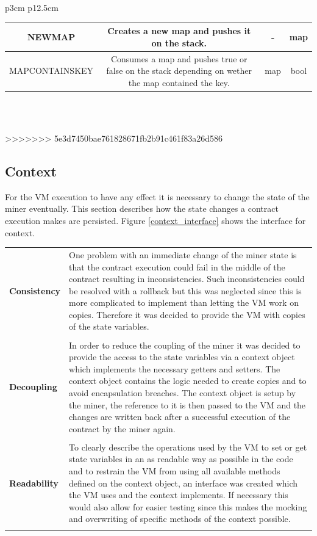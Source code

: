 \begin{tabular}[t]{ p{3cm} p{12.5cm}}
\begin{tabular}[t]{ | c | c | c | c | }
NEWMAP &
Creates a new map and pushes it on the stack. &
- &
map \\ \hline

MAPCONTAINSKEY &
Consumes a map and pushes true or false on the stack depending on wether the map contained the key. &
map &
bool \\ \hline

\end{tabular}
 \\ \\

\end{tabular}

>>>>>>> 5e3d7450bae761828671fb2b91c461f83a26d586
\subsection{Context}
For the VM execution to have any effect it is necessary to change the state of the miner eventually. This section describes how the state changes a contract execution makes are persisted. Figure \ref{context_interface} shows the interface for context.

\begin{tabular}[t]{ p{3cm} p{12.5cm}}
\raggedright
\textbf{Consistency} &
One problem with an immediate change of the miner state is that the contract execution could fail in the middle of the contract resulting in inconsistencies. Such inconsistencies could be resolved with a rollback but this was neglected since this is more complicated to implement than letting the VM work on copies. Therefore it was decided to provide the VM with copies of the state variables. \\ \\

\raggedright
\textbf{Decoupling} &
In order to reduce the coupling of the miner it was decided to provide the access to the state variables via a context object which implements the necessary getters and setters. The context object contains the logic needed to create copies and to avoid encapsulation breaches. The context object is setup by the miner, the reference to it is then passed to the VM and the changes are written back after a successful execution of the contract by the miner again. \\ \\

\raggedright
\textbf{Readability} &
To clearly describe the operations used by the VM to set or get state variables in an as readable way as possible in the code and to restrain the VM from using all available methods defined on the context object, an interface was created which the VM uses and the context implements. If necessary this would also allow for easier testing since this makes the mocking and overwriting of specific methods of the context possible. \\ \\ 
\end{tabular}

